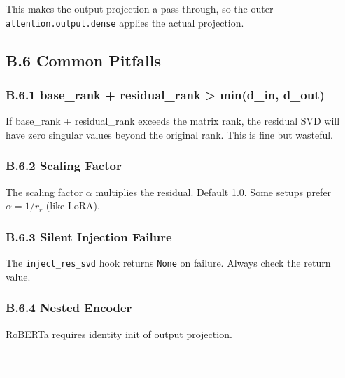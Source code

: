 This makes the output projection a pass-through, so the outer 
\texttt{attention.output.dense} applies the actual projection.

\subsection{B.6 Common Pitfalls}

\subsubsection{B.6.1 base\_rank + residual\_rank \textgreater{} min(d\_in, d\_out)}

If base\_rank + residual\_rank exceeds the matrix rank, the residual SVD 
will have zero singular values beyond the original rank. This is fine 
but wasteful.

\subsubsection{B.6.2 Scaling Factor}

The scaling factor $\alpha$ multiplies the residual. Default 1.0. Some 
setups prefer $\alpha = 1/r_r$ (like LoRA).

\subsubsection{B.6.3 Silent Injection Failure}

The \texttt{inject\_res\_svd} hook returns \texttt{None} on failure. Always check the 
return value.

\subsubsection{B.6.4 Nested Encoder}

RoBERTa requires identity init of output projection.
\begin{lstlisting}

---
\end{lstlisting}